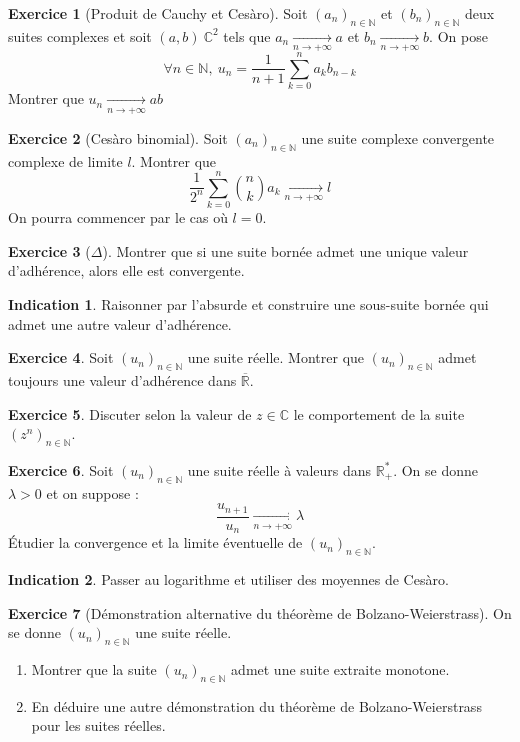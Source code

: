 \documentclass[french]{book}
\newcommand{\N}{\mathbb{N}}
\newcommand{\R}{\mathbb{R}}
\newcommand{\C}{\mathbb{C}}
\newcommand{\st}{^*}
\theoremstyle{definition}
\newtheorem{ex}{Exercice}[chapter]
\theoremstyle{theorem}
\newtheorem*{ind}{Indication}
\theoremstyle{remark}
\begin{document}
\begin{ex}[Produit de Cauchy et Cesàro]
	Soit $(a_n)_{n \in\N}$ et $(b_n)_{n \in\N}$ deux suites complexes et soit $(a,b) \ \C^2$ tels que $a_n \underset{n \longrightarrow + \infty}{\longrightarrow} a $ et $b_n \underset{n \longrightarrow + \infty}{\longrightarrow} b $. On pose $$\forall n \in \N, \ u_n = \frac{1}{n+1}\sum_{k=0}^{n}a_k b_{n-k} $$ Montrer que $u_n \xrightarrow[n\to+\infty]{} ab$
\end{ex}

\begin{ex}[Cesàro binomial]
	Soit $(a_n)_{n \in\N}$ une suite complexe convergente complexe de limite $l$. Montrer que $$\frac{1}{2^n}\sum_{k=0}^{n}\binom{n}{k}a_k \xrightarrow[n\to+\infty]{}l $$ On pourra commencer par le cas où $l=0$.
\end{ex}

\begin{ex}[$\Delta$]
	Montrer que si une suite bornée admet une unique valeur d'adhérence, alors elle est convergente.
\end{ex}

\begin{ind}
	Raisonner par l'absurde et construire une sous-suite bornée qui admet une autre valeur d'adhérence.
\end{ind}

\begin{ex}
	Soit $(u_n)_{n\in\N}$ une suite réelle. Montrer que $(u_n)_{n\in\N}$ admet toujours une valeur d'adhérence dans $\overline{\R}$.
\end{ex}

\begin{ex}
	Discuter selon la valeur de $z\in\C$ le comportement de la suite $(z^n)_{n\in\N}$.
\end{ex}

\begin{ex}
	Soit $(u_n)_{n\in\N}$ une suite réelle à valeurs dans $\R_+\st$. On se donne $\lambda >0$ et on suppose : $$\frac{u_{n+1}}{u_n}\xrightarrow[n\to+\infty]{}\lambda$$ Étudier la convergence et la limite éventuelle de $(u_n)_{n\in\N}$.
\end{ex}

\begin{ind}
	Passer au logarithme et utiliser des moyennes de Cesàro.
\end{ind}

\begin{ex}[Démonstration alternative du théorème de Bolzano-Weierstrass]
	On se donne $(u_n)_{n\in\N}$ une suite réelle.
	\begin{enumerate}
		\item Montrer que la suite $(u_n)_{n\in\N}$ admet une suite extraite monotone.
		\item En déduire une autre démonstration du théorème de Bolzano-Weierstrass pour les suites réelles.
	\end{enumerate}
\end{ex}
\end{document}
